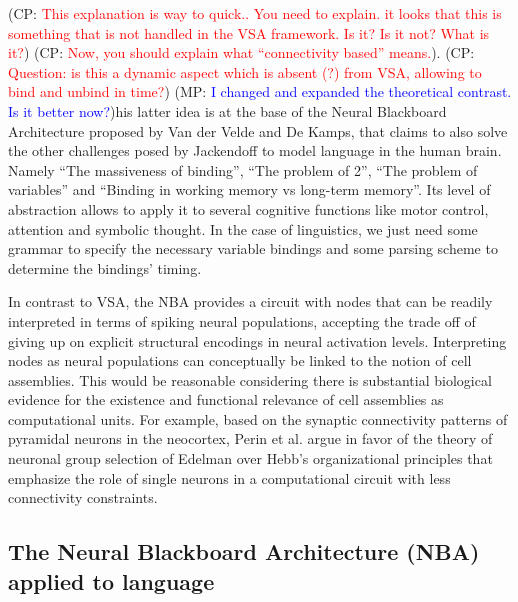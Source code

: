 \documentclass[10pt]{article}
\newcommand{\noteCP}[1]{(CP: \textcolor{red}{#1})}
\newcommand{\noteMP}[3]{(MP: \textcolor{blue}{#1})}
\begin{document}
\noteCP{This explanation is way to quick.. You need to explain. it looks that this is something that is not handled in the VSA framework. Is it? Is it not? What is it?}
\noteCP{Now, you should explain what ``connectivity based'' means.}.
\noteCP{Question: is this a dynamic aspect which is absent (?) from VSA, allowing to bind and unbind in time?}
\noteMP{I changed and expanded the theoretical contrast. Is it better now?}.

This latter idea is at the base of the Neural Blackboard Architecture proposed by Van der Velde and De Kamps\cite{van_der_Velde_2006}, that claims to also solve the other challenges posed by Jackendoff to model language in the human brain.
Namely ``The massiveness of binding'', ``The problem of 2'', ``The problem of variables'' and ``Binding in working memory vs long-term memory''.
Its level of abstraction allows to apply it to several cognitive functions like motor control, attention and symbolic thought.
In the case of linguistics, we just need some grammar to specify the necessary variable bindings and some parsing scheme to determine the bindings' timing.

In contrast to VSA, the NBA provides a circuit with nodes that can be readily interpreted in terms of spiking neural populations, accepting the trade off of giving up on explicit structural encodings in neural activation levels.
Interpreting nodes as neural populations can conceptually be linked to the notion of cell assemblies.
This would be reasonable considering there is substantial biological evidence for the existence and functional relevance of cell assemblies as computational units\cite{Huyck_2013}.
For example, based on the synaptic connectivity patterns of pyramidal neurons in the neocortex, Perin et al.\cite{Perin_2011} argue in favor of the theory of neuronal group selection of Edelman\cite{edelman1987neural} over Hebb's organizational principles\cite{hebb2005organization} that emphasize the role of single neurons in a computational circuit with less connectivity constraints.


\subsection{The Neural Blackboard Architecture (NBA) applied to language}

{\label{935508}}
\end{document}
